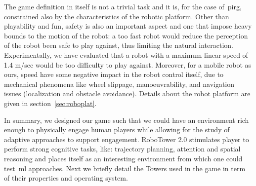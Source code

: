 The game definition in itself is not a trivial task and it is, for the case of~\gls{pirg}, constrained also by the characteristics of the robotic platform. Other than playability and fun, safety is also an important aspect and one that impose heavy bounds to the motion of the robot: a too fast  robot would reduce the perception of the robot been safe to play against, thus limiting the natural interaction. Experimentally, we have evaluated that a robot with a maximum linear speed of 1.4 m/sec would be too difficulty to play against. Moreover, for a mobile robot as ours, speed have some negative impact in the robot control itself, due to mechanical phenomena like wheel slippage, manoeuvrability, and navigation issues (localization and obstacle avoidance). Details about the robot platform are given in section~\ref{sec:roboplat}.

In summary, we designed our game such that we could have an environment rich enough to physically engage human players while allowing for the study of adaptive approaches to support engagement. RoboTower 2.0 stimulates player to perform strong cognitive tasks, like: trajectory planning, attention and spatial reasoning and places itself as an interesting environment from which one could test~\gls{ml} approaches. Next we briefly detail the Towers used in the game in term of their properties and operating system.


